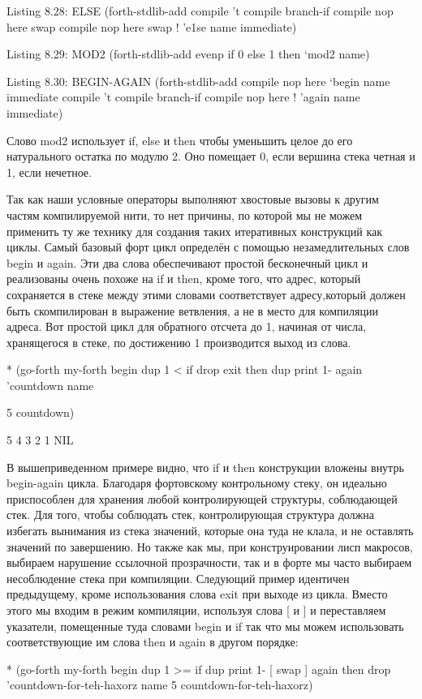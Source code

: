 {{{Listing 8.28: ELSE
(forth-stdlib-add
{ compile ’t
compile branch-if
compile nop
here swap
compile nop
here swap ! } ’e1se name immediate)

Listing 8.29: MOD2
(forth-stdlib-add
{ evenp if 0 else 1 then } ‘mod2 name)

Listing 8.30: BEGIN-AGAIN
(forth-stdlib-add
{ compile nop
here } ‘begin name immediate
{ compile ’t
compile branch-if
compile nop
here ! } ’again name immediate)

Слово mod2 использует if, else и then чтобы уменьшить целое до его натурального остатка по модулю 2. Оно помещает 0, если вершина стека четная и 1, если нечетное.

Так как наши условные операторы  выполняют хвостовые вызовы к другим частям компилируемой нити, то нет причины, по которой мы не можем применить ту же технику для создания таких итеративных конструкций как циклы. Самый базовый форт цикл определён с помощью незамедлительных слов begin и again. Эти два слова обеспечивают простой бесконечный цикл и реализованы очень похоже на if и then, кроме того, что адрес, который сохраняется в стеке между этими словами соответствует адресу,который должен быть скомпилирован в выражение ветвления, а не в место для компиляции адреса. Вот простой цикл для обратного отсчета до 1, начиная от числа, хранящегося в стеке, по достижению 1 производится выход из слова.

* (go-forth my-forth
{ begin
dup 1 < if drop exit then
dup print
1-
again } ’countdown name

5 countdown)

5
4
3
2
1
NIL

В вышеприведенном примере видно, что if и then конструкции вложены внутрь begin-again цикла. Благодаря фортовскому контрольному стеку, он идеально приспособлен для хранения любой контролирующей структуры, соблюдающей стек. Для того, чтобы соблюдать стек, контролирующая структура должна избегать вынимания из стека значений, которые она туда не клала, и не оставлять значений по завершению. Но также как мы, при конструировании лисп макросов, выбираем нарушение ссылочной прозрачности, так и в форте мы часто выбираем несоблюдение стека при компиляции. Следующий пример идентичен предыдущему, кроме использования слова exit при выходе из цикла. Вместо этого мы входим в режим компиляции, используя слова [ и ] и переставляем указатели, помещенные туда словами begin и if так что мы можем использовать соответствующие им слова then и again в другом порядке: 

* (go-forth my-forth
{ begin
dup 1 >= if
dup print
1-
[ swap ] again
then
drop
} ’countdown-for-teh-haxorz name
5 countdown-for-teh-haxorz)

}}}

